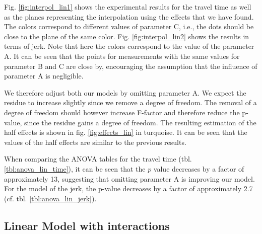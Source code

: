 Fig. \ref{fig:interpol_lin1} shows the experimental results for the travel time as well as the planes representing the interpolation using the effects that we have found. The colors correspond to different values of parameter C, i.e., the dots should be close to the plane of the same color. Fig. \ref{fig:interpol_lin2} shows the results in terms of jerk. Note that here the colors correspond to the value of the parameter A. It can be seen that the points for measurements with the same values for parameter B and C are close by, encouraging the assumption that the influence of parameter A is negligible.

We therefore adjust both our models by omitting parameter A. We expect the residue to increase slightly since we remove a degree of freedom. The removal of a degree of freedom should however increase F-factor and therefore reduce the p-value, since the residue gains a degree of freedom. The resulting estimation of the half effects is shown in fig. \ref{fig:effects_lin} in turquoise. It can be seen that the values of the half effects are similar to the previous results.

 When comparing the ANOVA tables for the travel time (tbl. \ref{tbl:anova_lin_time}), it can be seen that the $p$ value decreases by a factor of approximately 13, suggesting that omitting parameter A is improving our model. For the model of the jerk, the p-value   decreases by a factor of approximately 2.7 (cf. tbl. \ref{tbl:anova_lin_jerk}).


\subsection{Linear Model with interactions}

